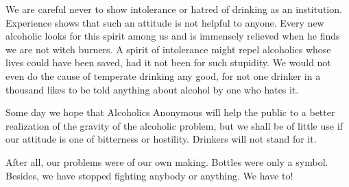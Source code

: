 \begin{biblechapter}
We are careful never to show intolerance or hatred of drinking as an institution.  Experience shows that such an attitude is not helpful to anyone.  Every new alcoholic looks for this spirit among us and is immensely relieved when he finds we are not witch burners.  A spirit of intolerance might repel alcoholics whose lives could have been saved, had it not been for such stupidity.  We would not even do the cause of temperate drinking any good, for not one drinker in a thousand likes to be told anything about alcohol by one who hates it.

Some day we hope that Alcoholics Anonymous will help the public to a better realization of the gravity of the alcoholic problem, but we shall be of little use if our attitude is one of bitterness or hostility.  Drinkers will not stand for it.

After all, our problems were of our own making.  Bottles were only a symbol.  Besides, we have stopped fighting anybody or anything.  We have to!

\end{biblechapter}

